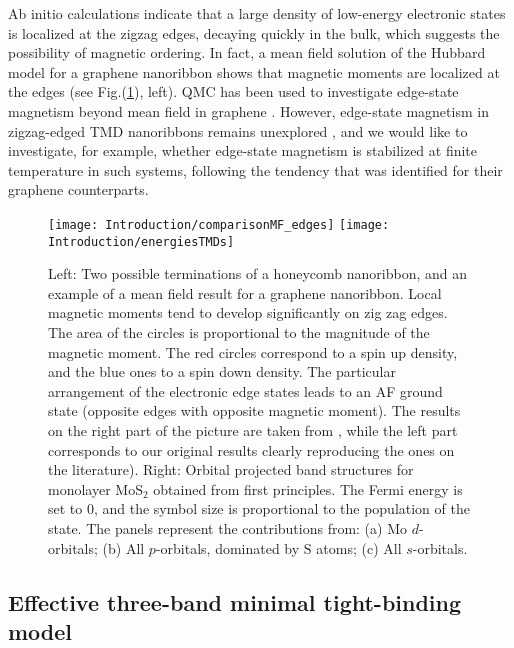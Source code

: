 Ab initio calculations indicate that a large density of low-energy electronic states is localized at the zigzag edges, decaying quickly in the bulk, which suggests the possibility of magnetic ordering.
In fact, a mean field solution of the Hubbard model for a graphene nanoribbon shows that magnetic moments are localized at the edges \cite{yazyev_emergence_2010} (see Fig.(\ref{fig:nanoribbons_energiesTMDs}), left).
QMC has been used to investigate edge-state magnetism beyond mean field in graphene \cite{feldner_dynamical_2011, golor_quantum_2013, cheng_strain-induced_2015, raczkowski_interplay_2017, yang_strain-tuning_2017}.
However, edge-state magnetism in zigzag-edged \ac{TMD} nanoribbons remains unexplored \cite{davelou_nanoribbon_2017}, and we would like to investigate, for example, whether edge-state magnetism is stabilized at finite temperature in such systems, following the tendency that was identified for their graphene counterparts.
\begin{figure}[H]
\texttt{[image: Introduction/comparisonMF\_edges]}
\hspace{5mm}
\texttt{[image: Introduction/energiesTMDs]}
 \caption[Zigzag edges of a nanoribbon and magnetism. Orbital projected band structures for monolayer $\text{Mo}\text{S}_2$ obtained from first principles.]{Left: Two possible terminations of a honeycomb nanoribbon, and an example of a mean field result for a  graphene nanoribbon.
Local magnetic moments tend to develop significantly on zig zag edges.
The area of the circles is proportional to the magnitude of the magnetic moment.
The red circles correspond to a spin up density, and the blue ones to a spin down density.
The particular arrangement of the electronic edge states leads to an \ac{AF} ground state (opposite edges with opposite magnetic moment). The results on the right part of the picture are taken from \cite{yazyev_emergence_2010}, while the left part corresponds to our original results clearly reproducing the ones on the literature). Right: Orbital projected band structures for monolayer $\text{Mo}\text{S}_2$ obtained from first principles.
The Fermi energy is set to 0, and the symbol size is proportional to the population of the state.
The panels represent the contributions from: (a) $\text{Mo}$ $d$-orbitals; (b) All $p$-orbitals, dominated by $\text{S}$ atoms; (c) All $s$-orbitals. \label{fig:nanoribbons_energiesTMDs}}
\end{figure}

\subsection{Effective three-band minimal tight-binding model}\label{subsec:threeband}

